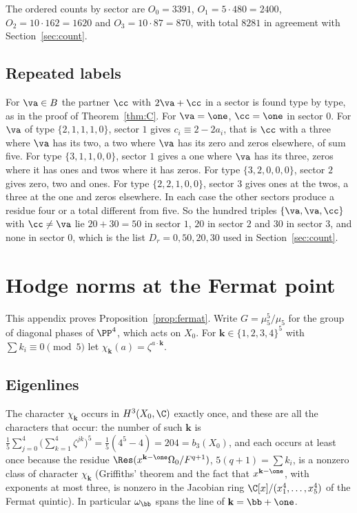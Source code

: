 The ordered counts by sector are $O_0=3391$, $O_1=5\cdot480=2400$,
$O_2=10\cdot162=1620$ and $O_3=10\cdot87=870$, with total $8281$ in
agreement with Section~\ref{sec:count}.

\subsection{Repeated labels}

For $\va\in B$ the partner $\cc$ with $2\va+\cc$ in a sector is found type
by type, as in the proof of Theorem~\ref{thm:C}. For $\va=\one$, $\cc=\one$
in sector $0$. For $\va$ of type $\{2,1,1,1,0\}$, sector $1$ gives
$c_i\equiv2-2a_i$, that is $\cc$ with a three where $\va$ has its two, a two
where $\va$ has its zero and zeros elsewhere, of sum five. For type
$\{3,1,1,0,0\}$, sector $1$ gives a one where $\va$ has its three, zeros
where it has ones and twos where it has zeros. For type $\{3,2,0,0,0\}$,
sector $2$ gives zero, two and ones. For type $\{2,2,1,0,0\}$, sector $3$
gives ones at the twos, a three at the one and zeros elsewhere. In each case
the other sectors produce a residue four or a total different from five.
So the hundred triples $\{\va,\va,\cc\}$ with $\cc\ne\va$ lie $20+30=50$ in
sector $1$, $20$ in sector $2$ and $30$ in sector $3$, and none in sector
$0$, which is the list $D_r=0,50,20,30$ used in Section~\ref{sec:count}.

\section{Hodge norms at the Fermat point}\label{app:fermat}

This appendix proves Proposition~\ref{prop:fermat}. Write
$G=\mu_5^5/\mu_5$ for the group of diagonal phases of $\PP^4$, which acts
on $X_0$. For $\mathbf k\in\{1,2,3,4\}^5$ with $\sum k_i\equiv0\pmod5$ let
$\chi_{\mathbf k}(a)=\zeta^{a\cdot\mathbf k}$.

\subsection{Eigenlines}

The character $\chi_{\mathbf k}$ occurs in $H^3(X_0,\C)$ exactly once, and
these are all the characters that occur: the number of such $\mathbf k$ is
$\frac15\sum_{j=0}^4\big(\sum_{k=1}^4\zeta^{jk}\big)^5=\frac15(4^5-4)=204
=b_3(X_0)$, and each occurs at least once because the residue
$\Res(x^{\mathbf k-\one}\Omega_0/F^{q+1})$, $5(q+1)=\sum k_i$, is a nonzero
class of character $\chi_{\mathbf k}$ (Griffiths' theorem and the fact that
$x^{\mathbf k-\one}$, with exponents at most three, is nonzero in the
Jacobian ring $\C[x]/(x_1^4,\dots,x_5^4)$ of the Fermat quintic). In
particular $\omega_{\bb}$ spans the line of $\mathbf k=\bb+\one$.


